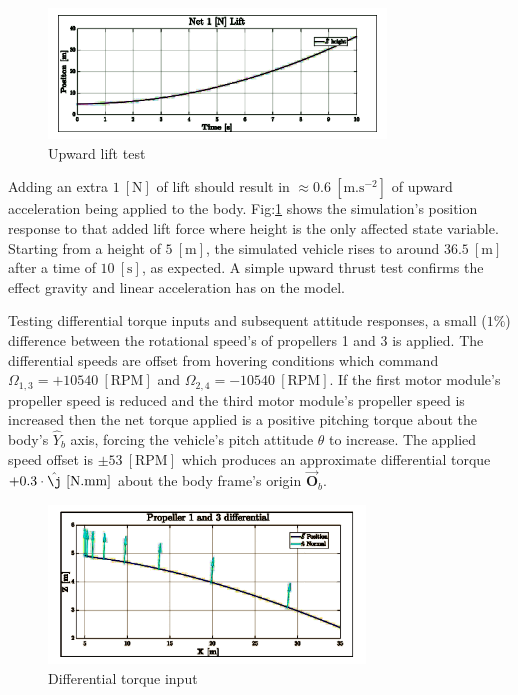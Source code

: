 \begin{figure}[hbtp]
\vspace{-12pt}
\centering
\includegraphics[width=0.8\textwidth]{graphs/upward_acceleration}
\vspace{-10pt}
\caption{Upward lift test}
\label{fig:upward_accl}
\end{figure}
\par
Adding an extra $1~[\text{N}]$ of lift should result in $\approx 0.6~[\text{m.s}^{-2}]$ of upward acceleration being applied to the body. Fig:\ref{fig:upward_accl} shows the simulation's position response to that added lift force where height is the only affected state variable. Starting from a height of $5~[\text{m}]$, the simulated vehicle rises to around $36.5~[\text{m}]$ after a time of $10~[\text{s}]$, as expected. A simple upward thrust test confirms the effect gravity and linear acceleration has on the model.
\par
Testing differential torque inputs and subsequent attitude responses, a small ($1\%$) difference between the rotational speed's of propellers 1 and 3 is applied. The differential speeds are offset from hovering conditions which command $\Omega_{1,3}=+10540~[\text{RPM}]$ and $\Omega_{2,4}=-10540~[\text{RPM}]$. If the first motor module's propeller speed is reduced and the third motor module's propeller speed is increased then the net torque applied is a positive pitching torque about the body's $\hat{Y}_b$ axis, forcing the vehicle's pitch attitude $\theta$ to increase. The applied speed offset is $\pm 53~[\text{RPM}]$ which produces an approximate differential torque $+0.3\cdot\hat{\j}~[\text{N.mm}]$ about the body frame's origin $\vec{\mathbf{O}}_b$. 
\begin{figure}[htbp]
\vspace{-8pt}
\centering
\includegraphics[width=0.75\textwidth]{graphs/propeller_differential}
\vspace{-6pt}
\caption{Differential torque input}
\label{fig:differential_prop}
\vspace{-10pt}
\end{figure}
